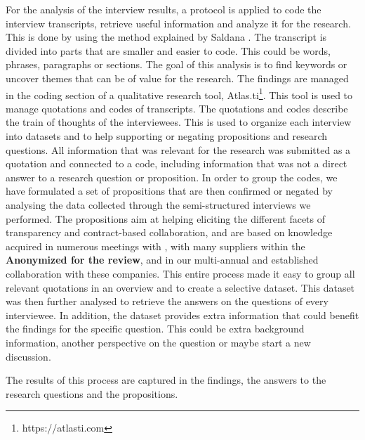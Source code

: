  For the analysis of the interview results, a protocol is applied to code the interview transcripts, retrieve useful information and analyze it for the research. This is done by using the method explained by Saldana \cite{saldana2015coding}. The transcript is divided into parts that are smaller and easier to code. This could be words, phrases, paragraphs or sections. The goal of this analysis is to find keywords or uncover themes that can be of value for the research. The findings are managed in the coding section of a qualitative research tool, Atlas.ti\footnote{https://atlasti.com}. %
This tool is used to manage quotations and codes of transcripts. The quotations and codes describe the train of thoughts of the interviewees. This is used to organize each interview into datasets and to help supporting or negating propositions and research questions. All information that was relevant for the research was submitted as a quotation and connected to a code, including information that was not a direct answer to a research question or proposition. 
In order to group the codes, we have formulated a set of propositions that are then confirmed or negated by analysing the data collected through the semi-structured interviews we performed.
The propositions aim at helping eliciting the different facets of transparency and contract-based collaboration, and are based on knowledge acquired in numerous meetings with \company{}, with many suppliers within the {\bf Anonymized for the review},
and in our multi-annual and established collaboration with these companies. 
This entire process made it easy to group all relevant quotations in an overview and to create a selective dataset. %
This dataset was then further analysed to retrieve the answers on the questions of every interviewee. In addition, the dataset provides extra information that could benefit the findings for the specific question. This could be extra background information, another perspective on the question or maybe start a new discussion. 

The results of this process are captured in the findings, the answers to the research questions and the propositions.

